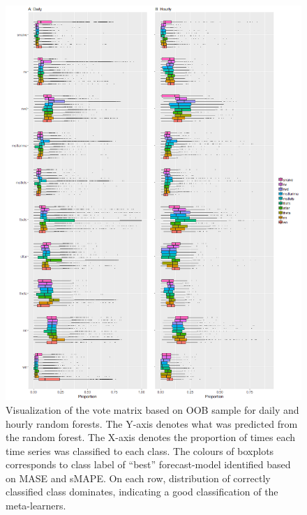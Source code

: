 \documentclass[11pt,a4paper,]{article}
\begin{document}
\begin{figure}
\centering
\includegraphics{figures/oobdailyhourly-1.png}
\caption{\label{fig:oobdailyhourly}Visualization of the vote matrix based on
OOB sample for daily and hourly random forests. The Y-axis denotes what
was predicted from the random forest. The X-axis denotes the proportion
of times each time series was classified to each class. The colours of
boxplots corresponds to class label of ``best'' forecast-model
identified based on MASE and sMAPE. On each row, distribution of
correctly classified class dominates, indicating a good classification
of the meta-learners.}
\end{figure}

\newpage
\end{document}
